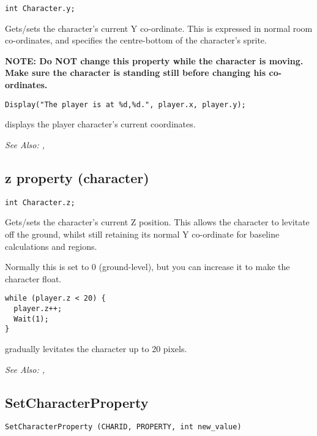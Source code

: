 \begin{verbatim}
int Character.y;
\end{verbatim}

Gets/sets the character's current Y co-ordinate. This is expressed in normal room
co-ordinates, and specifies the centre-bottom of the character's sprite.

\bf{NOTE:} Do \bf{NOT} change this property while the character is moving. Make
sure the character is standing still before changing his co-ordinates.

\begin{verbatim}
Display("The player is at %d,%d.", player.x, player.y);
\end{verbatim}
displays the player character's current coordinates.

\it{See Also:} ,


\subsection{z property (character)}\label{Character.z}%

\begin{verbatim}
int Character.z;
\end{verbatim}

Gets/sets the character's current Z position. This allows the character to levitate
off the ground, whilst still retaining its normal Y co-ordinate for baseline calculations
and regions.

Normally this is set to 0 (ground-level), but you can increase it to make the character float.

\begin{verbatim}
while (player.z < 20) {
  player.z++;
  Wait(1);
}
\end{verbatim}
gradually levitates the character up to 20 pixels.

\it{See Also:} ,


\subsection{SetCharacterProperty}\label{SetCharacterProperty}%

\begin{verbatim}
SetCharacterProperty (CHARID, PROPERTY, int new_value)
\end{verbatim}

